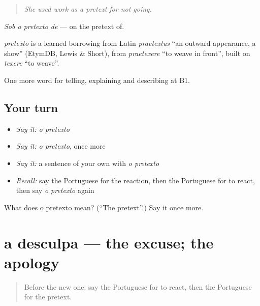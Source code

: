 \begin{quote}
\emph{She used work as a pretext for not going.}
\end{quote}

\emph{Sob o pretexto de} — on the pretext of.

\begin{cousinweb}
\emph{pretexto} is a learned borrowing from Latin \emph{praetextus} \textquotedblleft{}an outward appearance, a show\textquotedblright{} (EtymDB, Lewis \& Short), from \emph{praetexere} \textquotedblleft{}to weave in front\textquotedblright{}, built on \emph{texere} \textquotedblleft{}to weave\textquotedblright{}.
\end{cousinweb}

\begin{grammarlens}[title={What you've built}]
One more word for telling, explaining and describing at B1.
\end{grammarlens}

\subsection*{Your turn}
\begin{itemize}
\raggedright
  \item \emph{Say it:} \emph{o pretexto}
  \item \emph{Say it:} \emph{o pretexto}, once more
  \item \emph{Say it:} a sentence of your own with \emph{o pretexto}
  \item \emph{Recall:} say the Portuguese for the reaction, then the Portuguese for to react, then say \emph{o pretexto} again
\end{itemize}

\begin{tcolorbox}[breakable,colback=teal!4,colframe=teal!35!black,title={Before you move on}]
What does o pretexto mean? (\textquotedblleft{}The pretext\textquotedblright{}.) Say it once more.
\end{tcolorbox}
\section[a desculpa]{a desculpa — the excuse; the apology}

\label{lesson:PT-C352-desculpa}



\begin{quote}
Before the new one: say the Portuguese for to react, then the Portuguese for the pretext.
\end{quote}

